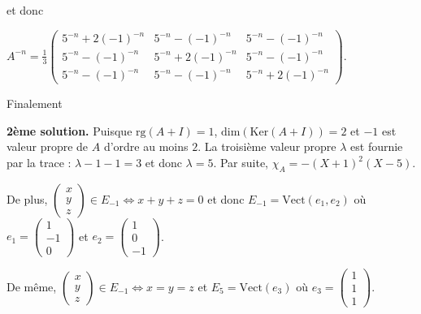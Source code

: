 {{et donc

\begin{center}
$
A^{-n}=\frac{1}{3}\left(\begin{array}{ccc}
5^{-n}+2(-1)^{-n}&5^{-n}-(-1)^{-n}&5^{-n}-(-1)^{-n}\\
5^{-n}-(-1)^{-n}&5^{-n}+2(-1)^{-n}&5^{-n}-(-1)^{-n}\\
5^{-n}-(-1)^{-n}&5^{-n}-(-1)^{-n}&5^{-n}+2(-1)^{-n}
\end{array}
\right)$.
\end{center}

Finalement

\begin{center}
\end{center}

\textbf{2ème solution.} Puisque $\text{rg}(A+I)=1$, $\text{dim}(\text{Ker}(A+I))=2$ et $-1$ est valeur propre de $A$ d'ordre au moins $2$. La troisième valeur propre $\lambda$ est fournie par la trace : $\lambda-1-1=3$ et donc $\lambda=5$. Par suite, $\chi_A=-(X+1)^2(X-5)$.

De plus, $\left(\begin{array}{c}
x\\
y\\
z
\end{array}
\right)\in E_{-1}\Leftrightarrow x+y+z=0$ et donc $E_{-1}=\text{Vect}(e_1,e_2)$ où $e_1=\left(\begin{array}{c}
1\\
-1\\
0
\end{array}
\right)$ et $e_2=\left(\begin{array}{c}
1\\
0\\
-1
\end{array}
\right)$.

De même,  $\left(\begin{array}{c}
x\\
y\\
z
\end{array}
\right)\in E_{-1}\Leftrightarrow x=y=z$ et $E_5=\text{Vect}(e_3)$ où $e_3=\left(\begin{array}{c}
1\\
1\\
1
\end{array}
\right)$.

}}
